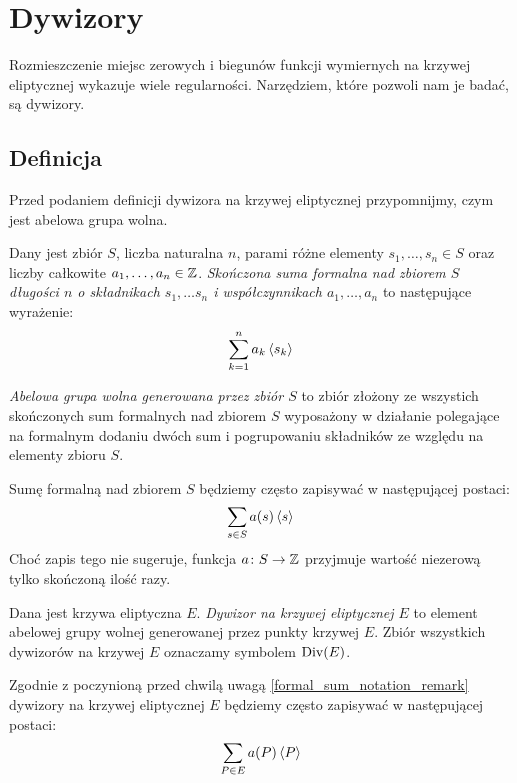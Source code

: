 \section{Dywizory}

\noindent
Rozmieszczenie miejsc zerowych i biegunów
funkcji wymiernych na krzywej eliptycznej
wykazuje wiele regularności.
Narzędziem, które pozwoli nam je badać, są dywizory.

\subsection*{Definicja}

\noindent
Przed podaniem definicji dywizora na krzywej eliptycznej przypomnijmy,
czym jest abelowa grupa wolna.

\begin{definition}
Dany jest zbiór $S$,
liczba naturalna $n$,
parami różne elementy $s_1, \ldots, s_n \in S$
oraz liczby całkowite $a_1, \ldots, a_n \in \mathbb{Z}$.
\emph{Skończona suma formalna nad zbiorem $S$ długości $n$
o składnikach $s_1, \ldots s_n$ i współczynnikach $a_1, \ldots, a_n$}
to następujące wyrażenie:
\begin{equation*}
\sum_{k=1}^n a_k\left\langle s_k\right\rangle
\end{equation*}

\emph{Abelowa grupa wolna generowana przez zbiór $S$}
to zbiór złożony ze wszystich skończonych sum formalnych nad zbiorem $S$
wyposażony w działanie polegające na formalnym dodaniu dwóch sum
i pogrupowaniu składników ze względu na elementy zbioru $S$.
\end{definition}

\begin{remark}\label{formal_sum_notation_remark}
Sumę formalną nad zbiorem $S$ będziemy często zapisywać
w następującej postaci:
\begin{equation*}
\sum_{s \in S}a(s)\left\langle s\right\rangle
\end{equation*}
Choć zapis tego nie sugeruje,
funkcja $a \colon S \to \mathbb{Z}$ przyjmuje wartość niezerową
tylko skończoną ilość razy.
\end{remark}

\begin{definition}
Dana jest krzywa eliptyczna $E$.
\emph{Dywizor na krzywej eliptycznej $E$}
to element abelowej grupy wolnej generowanej przez punkty krzywej $E$.
Zbiór wszystkich dywizorów na krzywej $E$ oznaczamy symbolem $\operatorname{Div}(E)$.
\end{definition}

\begin{remark}
Zgodnie z poczynioną przed chwilą uwagą \ref{formal_sum_notation_remark}
dywizory na krzywej eliptycznej $E$ będziemy często zapisywać
w następującej postaci:
\begin{equation*}
\sum_{P \in E} a(P)\left\langle P\right\rangle
\end{equation*}
\end{remark}

